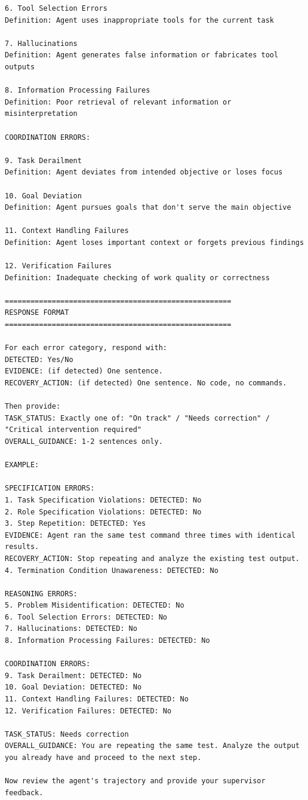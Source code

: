 \begin{lstlisting}[basicstyle=\ttfamily\scriptsize,xleftmargin=-4pt,xrightmargin=-4pt]
6. Tool Selection Errors
Definition: Agent uses inappropriate tools for the current task

7. Hallucinations
Definition: Agent generates false information or fabricates tool outputs

8. Information Processing Failures
Definition: Poor retrieval of relevant information or misinterpretation

COORDINATION ERRORS:

9. Task Derailment
Definition: Agent deviates from intended objective or loses focus

10. Goal Deviation
Definition: Agent pursues goals that don't serve the main objective

11. Context Handling Failures
Definition: Agent loses important context or forgets previous findings

12. Verification Failures
Definition: Inadequate checking of work quality or correctness

=====================================================
RESPONSE FORMAT
=====================================================

For each error category, respond with:
DETECTED: Yes/No
EVIDENCE: (if detected) One sentence.
RECOVERY_ACTION: (if detected) One sentence. No code, no commands.

Then provide:
TASK_STATUS: Exactly one of: "On track" / "Needs correction" / "Critical intervention required"
OVERALL_GUIDANCE: 1-2 sentences only.

EXAMPLE:

SPECIFICATION ERRORS:
1. Task Specification Violations: DETECTED: No
2. Role Specification Violations: DETECTED: No
3. Step Repetition: DETECTED: Yes
EVIDENCE: Agent ran the same test command three times with identical results.
RECOVERY_ACTION: Stop repeating and analyze the existing test output.
4. Termination Condition Unawareness: DETECTED: No

REASONING ERRORS:
5. Problem Misidentification: DETECTED: No
6. Tool Selection Errors: DETECTED: No
7. Hallucinations: DETECTED: No
8. Information Processing Failures: DETECTED: No

COORDINATION ERRORS:
9. Task Derailment: DETECTED: No
10. Goal Deviation: DETECTED: No
11. Context Handling Failures: DETECTED: No
12. Verification Failures: DETECTED: No

TASK_STATUS: Needs correction
OVERALL_GUIDANCE: You are repeating the same test. Analyze the output you already have and proceed to the next step.

Now review the agent's trajectory and provide your supervisor feedback.
\end{lstlisting}

